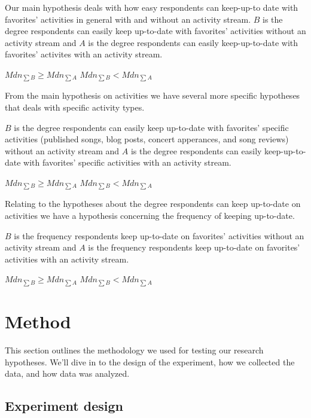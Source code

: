 Our main hypothesis deals with how easy respondents can keep-up-to
date with favorites' activities in general with and without an 
activity stream.
$B$ is the degree respondents can easily keep up-to-date with
favorites' activities without an activity stream and $A$ is the degree
respondents can easily keep-up-to-date with favorites' activites  with
an activity stream.
\begin{items}
   $Mdn_{\sum{B}} \geq Mdn_{\sum{A}}$
   $Mdn_{\sum{B}} < Mdn_{\sum{A}}$
\end{items}

From the main hypothesis on activities we have several more specific
hypotheses that deals with specific activity types.

$B$ is the degree respondents can easily keep up-to-date with
favorites' specific activities
(published songs, blog posts, concert apperances, and song reviews)
without an activity stream and $A$ is the degree
respondents can easily keep-up-to-date with favorites' specific
activities with an activity stream.
\begin{items}
   $Mdn_{\sum{B}} \geq Mdn_{\sum{A}}$
   $Mdn_{\sum{B}} < Mdn_{\sum{A}}$
\end{items}

Relating to the hypotheses about the degree respondents can keep
up-to-date on activities we have a hypothesis concerning
the frequency of keeping up-to-date.

$B$ is the frequency respondents keep up-to-date on favorites' activities
without an activity stream and $A$ is the frequency respondents keep
up-to-date on favorites' activities with an activity stream.
\begin{items}
   $Mdn_{\sum{B}} \geq Mdn_{\sum{A}}$
   $Mdn_{\sum{B}} < Mdn_{\sum{A}}$
\end{items}

\section{Method}
\label{section:empirical.methodology}

This section outlines the methodology we used for testing our research
hypotheses. We'll dive in to the design of the experiment, how we collected
the data, and how data was analyzed.

\subsection{Experiment design}
\label{section:empirical.methodology.experiment.design}

